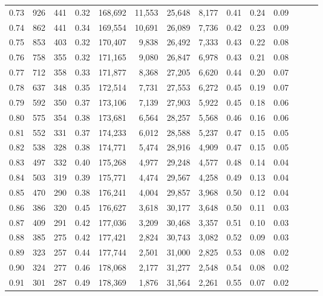\begin{tabular}{rrrrrrrrrrrrrr}
0.73 &    926 &  441 &  0.32 &  168,692 &   11,553 &  25,648 &   8,177 &  0.41 &  0.24 &      0.09 \\
0.74 &    862 &  441 &  0.34 &  169,554 &   10,691 &  26,089 &   7,736 &  0.42 &  0.23 &      0.09 \\
0.75 &    853 &  403 &  0.32 &  170,407 &    9,838 &  26,492 &   7,333 &  0.43 &  0.22 &      0.08 \\
0.76 &    758 &  355 &  0.32 &  171,165 &    9,080 &  26,847 &   6,978 &  0.43 &  0.21 &      0.08 \\
0.77 &    712 &  358 &  0.33 &  171,877 &    8,368 &  27,205 &   6,620 &  0.44 &  0.20 &      0.07 \\
0.78 &    637 &  348 &  0.35 &  172,514 &    7,731 &  27,553 &   6,272 &  0.45 &  0.19 &      0.07 \\
0.79 &    592 &  350 &  0.37 &  173,106 &    7,139 &  27,903 &   5,922 &  0.45 &  0.18 &      0.06 \\
0.80 &    575 &  354 &  0.38 &  173,681 &    6,564 &  28,257 &   5,568 &  0.46 &  0.16 &      0.06 \\
0.81 &    552 &  331 &  0.37 &  174,233 &    6,012 &  28,588 &   5,237 &  0.47 &  0.15 &      0.05 \\
0.82 &    538 &  328 &  0.38 &  174,771 &    5,474 &  28,916 &   4,909 &  0.47 &  0.15 &      0.05 \\
0.83 &    497 &  332 &  0.40 &  175,268 &    4,977 &  29,248 &   4,577 &  0.48 &  0.14 &      0.04 \\
0.84 &    503 &  319 &  0.39 &  175,771 &    4,474 &  29,567 &   4,258 &  0.49 &  0.13 &      0.04 \\
0.85 &    470 &  290 &  0.38 &  176,241 &    4,004 &  29,857 &   3,968 &  0.50 &  0.12 &      0.04 \\
0.86 &    386 &  320 &  0.45 &  176,627 &    3,618 &  30,177 &   3,648 &  0.50 &  0.11 &      0.03 \\
0.87 &    409 &  291 &  0.42 &  177,036 &    3,209 &  30,468 &   3,357 &  0.51 &  0.10 &      0.03 \\
0.88 &    385 &  275 &  0.42 &  177,421 &    2,824 &  30,743 &   3,082 &  0.52 &  0.09 &      0.03 \\
0.89 &    323 &  257 &  0.44 &  177,744 &    2,501 &  31,000 &   2,825 &  0.53 &  0.08 &      0.02 \\
0.90 &    324 &  277 &  0.46 &  178,068 &    2,177 &  31,277 &   2,548 &  0.54 &  0.08 &      0.02 \\
0.91 &    301 &  287 &  0.49 &  178,369 &    1,876 &  31,564 &   2,261 &  0.55 &  0.07 &      0.02 \\

\end{tabular}
